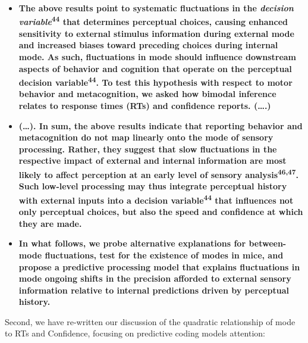 \documentclass[
]{article}
\begin{document}
\begin{itemize}
\item
  \textbf{The above results point to systematic fluctuations in the
  \emph{decision variable}\textsuperscript{44} that determines
  perceptual choices, causing enhanced sensitivity to external stimulus
  information during external mode and increased biases toward preceding
  choices during internal mode. As such, fluctuations in mode should
  influence downstream aspects of behavior and cognition that operate on
  the perceptual decision variable\textsuperscript{44}. To test this
  hypothesis with respect to motor behavior and metacognition, we asked
  how bimodal inference relates to response times (RTs) and confidence
  reports. (\ldots.)}
\item
  \textbf{(\ldots). In sum, the above results indicate that reporting
  behavior and metacognition do not map linearly onto the mode of
  sensory processing. Rather, they suggest that slow fluctuations in the
  respective impact of external and internal information are most likely
  to affect perception at an early level of sensory
  analysis\textsuperscript{46,47}. Such low-level processing may thus
  integrate perceptual history with external inputs into a decision
  variable\textsuperscript{44} that influences not only perceptual
  choices, but also the speed and confidence at which they are made.}
\item
  \textbf{In what follows, we probe alternative explanations for
  between-mode fluctuations, test for the existence of modes in mice,
  and propose a predictive processing model that explains fluctuations
  in mode ongoing shifts in the precision afforded to external sensory
  information relative to internal predictions driven by perceptual
  history.}
\end{itemize}

Second, we have re-written our discussion of the quadratic relationship
of mode to RTs and Confidence, focusing on predictive coding models
attention:
\end{document}
